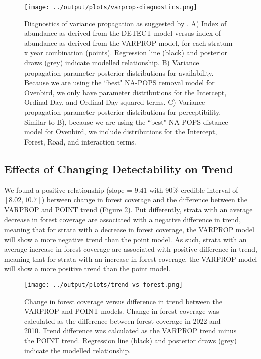 \documentclass[12pt]{article}
\begin{document}
\begin{figure}[h]
	\texttt{[image: ../output/plots/varprop-diagnostics.png]}
	\caption{Diagnostics of variance propagation as suggested by \citet{bravington_variance_2021}. A) Index of abundance as derived from the DETECT model versus index of abundance as derived from the VARPROP model, for each stratum x year combination (points). Regression line (black) and posterior draws (grey) indicate modelled relationship. B) Variance propagation parameter posterior distributions for availability. Because we are using the ``best" NA-POPS removal model for Ovenbird, we only have parameter distributions for the Intercept, Ordinal Day, and Ordinal Day squared terms. C) Variance propagation parameter posterior distributions for perceptibility. Similar to B), because we are using the ``best" NA-POPS distance model for Ovenbird, we include distributions for the Intercept, Forest, Road, and interaction terms.}
	\label{fig:varprop-diagnostics}
\end{figure}

\subsection{Effects of Changing Detectability on Trend}
\par We found a positive relationship (slope = $9.41$ with 90\% credible interval of $[8.02, 10.7]$) between change in forest coverage and the difference between the VARPROP and POINT trend (Figure \ref{fig:trend-vs-forest}).
Put differently, strata with an average decrease in forest coverage are associated with a negative difference in trend, meaning that for strata with a decrease in forest coverage, the VARPROP model will show a more negative trend than the point model.
As such, strata with an average increase in forest coverage are associated with positive difference in trend, meaning that for strata with an increase in forest coverage, the VARPROP model will show a more positive trend than the point model.

\begin{figure}[h]
	\texttt{[image: ../output/plots/trend-vs-forest.png]}
	\caption{Change in forest coverage versus difference in trend between the VARPROP and POINT models. Change in forest coverage was calculated as the difference between forest coverage in 2022 and 2010. Trend difference was calculated as the VARPROP trend minus the POINT trend. Regression line (black) and posterior draws (grey) indicate the modelled relationship.}
	\label{fig:trend-vs-forest}
\end{figure}
\end{document}
